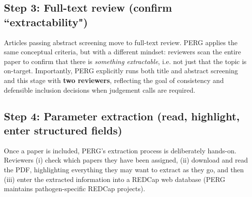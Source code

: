 \subsection*{Step 3: Full-text review (confirm ``extractability")}
Articles passing abstract screening move to full-text review. PERG applies the same conceptual criteria, but with a different mindset: reviewers scan the entire paper to confirm that there is \emph{something extractable}, i.e. not just that the topic is on-target. Importantly, PERG explicitly runs both title and abstract screening and this stage with \textbf{two reviewers}, reflecting the goal of consistency and defensible inclusion decisions when judgement calls are required.

\subsection*{Step 4: Parameter extraction (read, highlight, enter structured fields)}
Once a paper is included, PERG's extraction process is deliberately hands-on. Reviewers (i) check which papers they have been assigned, (ii) download and read the PDF, highlighting everything they may want to extract as they go, and then (iii) enter the extracted information into a REDCap web database (PERG maintains pathogen-specific REDCap projects).

